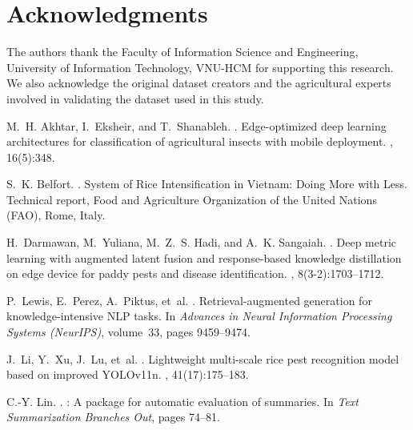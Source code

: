 ﻿\documentclass[11pt]{article}
\begin{document}
\section*{Acknowledgments}

The authors thank the Faculty of Information Science and Engineering, University of Information Technology, VNU-HCM for supporting this research. We also acknowledge the original dataset creators and the agricultural experts involved in validating the dataset used in this study.

\begin{thebibliography}{}

M.~H. Akhtar, I.~Eksheir, and T.~Shanableh.
.
\newblock Edge-optimized deep learning architectures for classification of agricultural insects with mobile deployment.
, 16(5):348.

S.~K. Belfort.
.
\newblock System of {Rice} {Intensification} in {Vietnam}: {Doing} More with Less.
\newblock Technical report, Food and Agriculture Organization of the United Nations (FAO), Rome, Italy.

H.~Darmawan, M.~Yuliana, M.~Z.~S. Hadi, and A.~K. Sangaiah.
.
\newblock Deep metric learning with augmented latent fusion and response-based knowledge distillation on edge device for paddy pests and disease identification.
, 8(3-2):1703--1712.

P.~Lewis, E.~Perez, A.~Piktus, et~al.
.
\newblock Retrieval-augmented generation for knowledge-intensive {NLP} tasks.
\newblock In {\em Advances in Neural Information Processing Systems (NeurIPS)}, volume~33, pages 9459--9474.

J.~Li, Y.~Xu, J.~Lu, et~al.
.
\newblock Lightweight multi-scale rice pest recognition model based on improved {YOLOv11n}.
, 41(17):175--183.

C.-Y. Lin.
.
: A package for automatic evaluation of summaries.
\newblock In {\em Text Summarization Branches Out}, pages 74--81.


\end{thebibliography}
\end{document}
